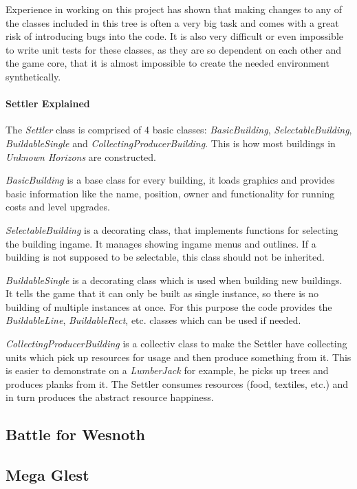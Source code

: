 Experience in working on this project has shown that making changes to any of the classes included in this tree is often
a very big task and comes with a great risk of introducing bugs into the code. It is also very difficult or even
impossible to write unit tests for these classes, as they are so dependent on each other and the game core, that it is
almost impossible to create the needed environment synthetically.

\paragraph{Settler Explained}
The \textit{Settler} class is comprised of 4 basic classes: \textit{BasicBuilding}, \textit{SelectableBuilding},
\textit{BuildableSingle} and \textit{CollectingProducerBuilding}. This is how most buildings in \textit{Unknown
Horizons} are constructed. 

\textit{BasicBuilding} is a base class for every building, it loads graphics and provides
basic information like the name, position, owner and functionality for running costs and level upgrades.

\textit{SelectableBuilding} is a decorating class, that implements functions for selecting the building ingame. It
manages showing ingame menus and outlines. If a building is not supposed to be selectable, this class should not be
inherited.

\textit{BuildableSingle} is a decorating class which is used when building new buildings. It tells the game that it can
only be built as single instance, so there is no building of multiple instances at once. For this purpose the code
provides the \textit{BuildableLine}, \textit{BuildableRect}, etc. classes which can be used if needed.

\textit{CollectingProducerBuilding} is a collectiv class to make the Settler have collecting units which pick up
resources for usage and then produce something from it. This is easier to demonstrate on a \textit{LumberJack} for
example, he picks up trees and produces planks from it. The Settler consumes resources (food, textiles, etc.) and in
turn produces the abstract resource happiness.






\subsection{Battle for Wesnoth}

\subsection{Mega Glest}

